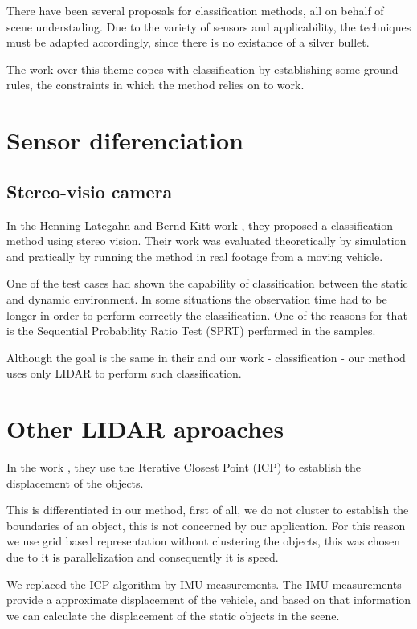 
There have been several proposals for classification methods, all on behalf of scene understading. Due to the variety of sensors and applicability, the techniques must be adapted accordingly, since there is no existance of a silver bullet. 

The work over this theme copes with classification by establishing some ground-rules, the constraints in which the method relies on to work.

\section{Sensor diferenciation}

\subsection{Stereo-visio camera}

In the Henning Lategahn and Bernd Kitt work \cite{DBLP:conf/ivs/LategahnGHKE11}, they proposed a classification method using stereo vision. Their work was evaluated theoretically by simulation and pratically by running the method in real footage from a moving vehicle.

One of the test cases had shown the capability of classification between the static and dynamic environment. In some situations the observation time had to be longer in order to perform correctly the classification. One of the reasons for that is the Sequential Probability Ratio Test (SPRT) performed in the samples.

Although the goal is the same in their and our work - classification - our method uses only LIDAR to perform such classification.

\section{Other LIDAR aproaches}

In the work \cite{4650636}, they use the Iterative Closest Point (ICP) \cite{10.1109/34.121791} to establish the displacement of the objects. 

This is differentiated in our method, first of all, we do not cluster to establish the boundaries of an object, this is not concerned by our application. For this reason we use grid based representation without clustering the objects, this was chosen due to it is parallelization and consequently it is speed.

We replaced the ICP algorithm by IMU measurements. The IMU measurements provide a approximate displacement of the vehicle, and based on that information we can calculate the displacement of the static objects in the scene.  
